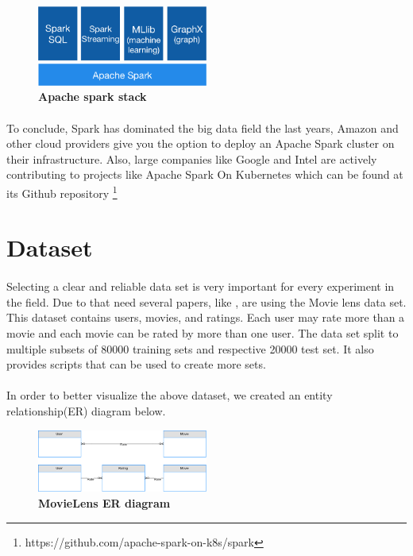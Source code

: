 \begin{figure}[ht]
  \centering
    \includegraphics[width=0.5\textwidth]{images/spark-stack.png}
    \caption{\bfseries Apache spark stack \cite{ApacheSpark:1}}
   \label{apacheSparkStack}
\end{figure}

\paragraph{} To conclude, Spark has dominated the big data field the last years, Amazon and other cloud providers give you the option to deploy an Apache Spark cluster on their infrastructure. Also, large companies like Google and Intel are actively contributing to projects like Apache Spark On Kubernetes which can be found at its Github repository \footnote{https://github.com/apache-spark-on-k8s/spark}

\section{Dataset}
\paragraph{}Selecting a clear and reliable data set is very important for every experiment in the field. Due to that need several papers, like \cite{levandoski2011recbench}, are using the Movie lens data set. This dataset contains users, movies, and ratings. Each user may rate more than a movie and each movie can be rated by more than one user. The data set split to multiple subsets of 80000 training sets and respective 20000 test set. It also provides scripts that can be used to create more sets.

\paragraph{} In order to better visualize the above dataset, we created an entity relationship(ER) diagram below.
\begin{figure}[ht]
  \centering
    \includegraphics[width=0.5\textwidth]{images/MovieLensDataset.png}
    \caption{\bfseries MovieLens ER diagram \cite{MovieLens:3}}
   \label{movieLensER}
\end{figure}


